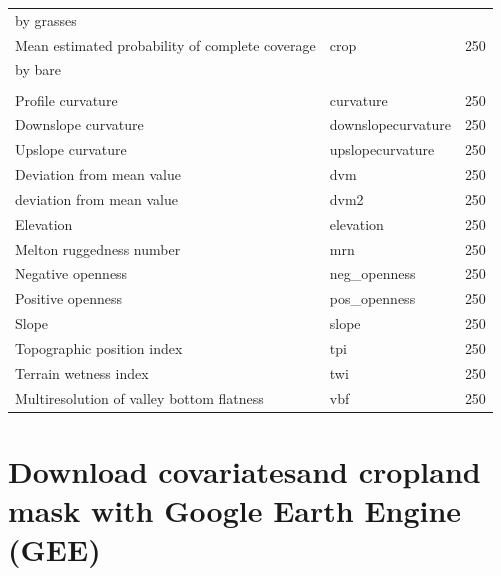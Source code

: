 \documentclass[
  10pt,
  b5paper,
  oneside]{book}
\begin{document}
\begin{table}
\begin{tabular}[t]{lll}
\hspace{1em}by grasses &  & \\
\hspace{1em}Mean estimated probability of complete coverage & crop & 250\\
\hspace{1em}by bare &  & \\
\addlinespace[0.3em]
\multicolumn{3}{l}{\textbf{Terrain}}\\
\hspace{1em}Profile curvature & curvature & 250\\
\hspace{1em}Downslope curvature & downslopecurvature & 250\\
\hspace{1em}Upslope curvature & upslopecurvature & 250\\
\hspace{1em}Deviation from mean value & dvm & 250\\
\hspace{1em}deviation from mean value & dvm2 & 250\\
\hspace{1em}Elevation & elevation & 250\\
\hspace{1em}Melton ruggedness number & mrn & 250\\
\hspace{1em}Negative openness & neg\_openness & 250\\
\hspace{1em}Positive openness & pos\_openness & 250\\
\hspace{1em}Slope & slope & 250\\
\hspace{1em}Topographic position index & tpi & 250\\
\hspace{1em}Terrain wetness index & twi & 250\\
\hspace{1em}Multiresolution of valley bottom flatness & vbf & 250\\
\bottomrule
\end{tabular}
\end{table}

\hypertarget{download-covariatesand-cropland-mask-with-google-earth-engine-gee}{%
\section{Download covariatesand cropland mask with Google Earth Engine (GEE)}\label{download-covariatesand-cropland-mask-with-google-earth-engine-gee}}
\end{document}
